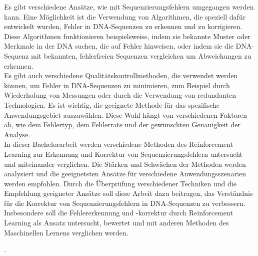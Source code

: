 \documentclass[oneside,bibliography=totocnumbered,BCOR=5mm]{scrbook}%
\theoremstyle{definition}
\theoremstyle{definition}
\theoremstyle{definition}
\theoremstyle{definition}
\theoremstyle{definition}
\theoremstyle{definition}
\begin{document}
Es gibt verschiedene Ansätze, wie mit Sequenzierungsfehlern umgegangen werden kann.
Eine Möglichkeit ist die Verwendung von Algorithmen, die speziell dafür entwickelt wurden, 
Fehler in DNA-Sequenzen zu erkennen und zu korrigieren. 
Diese Algorithmen funktionieren beispielsweise, indem sie bekannte Muster oder Merkmale in der DNA suchen, 
die auf Fehler hinweisen, oder indem sie die DNA-Sequenz mit bekannten, 
fehlerfreien Sequenzen vergleichen um Abweichungen zu erkennen.\\ 

Es gibt auch verschiedene Qualitätskontrollmethoden, die verwendet werden können, um Fehler in DNA-Sequenzen zu minimieren, 
zum Beispiel durch Wiederholung von Messungen oder durch die Verwendung von redundanten Technologien.
Es ist wichtig, die geeignete Methode für das spezifische Anwendungsgebiet auszuwählen. 
Diese Wahl hängt von verschiedenen Faktoren ab, wie dem Fehlertyp, dem Fehlerrate und der gewünschten Genauigkeit der Analyse.\\

In dieser Bachelorarbeit werden verschiedene Methoden des Reinforcement Learning 
zur Erkennung und Korrektur von Sequenzierungsfehlern untersucht und miteinander verglichen. 
Die Stärken und Schwächen der Methoden werden analysiert und die geeignetsten Ansätze für verschiedene Anwendungsszenarien werden empfohlen. 
Durch die Überprüfung verschiedener Techniken und die Empfehlung geeigneter Ansätze soll diese Arbeit dazu beitragen, 
das Verständnis für die Korrektur von Sequenzierungsfehlern in DNA-Sequenzen zu verbessern. 
Insbesondere soll die Fehlererkennung und -korrektur durch Reinforcement Learning als Ansatz 
untersucht, bewertet und mit anderen Methoden des Maschinellen Lernens verglichen werden.



\clearpage

\tableofcontents  



 \listoffigures
 

 \listoftables
 


 \lstlistoflistings

.

\newpage

\end{document}
